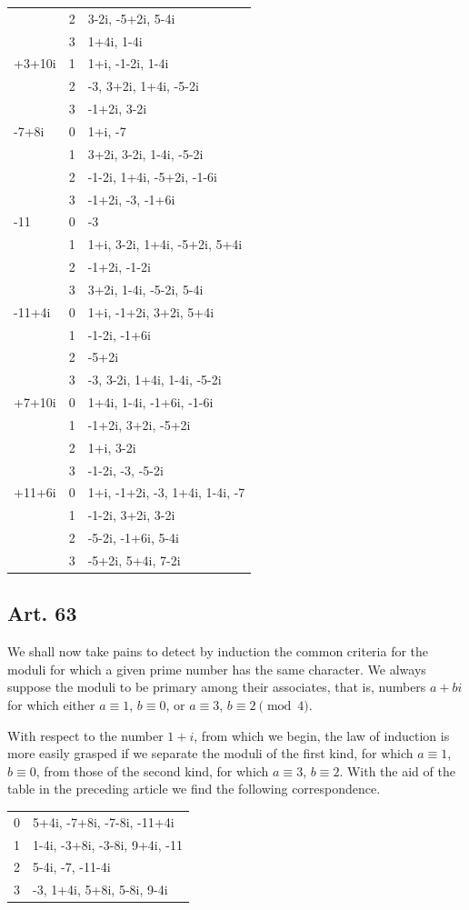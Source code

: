 \documentclass[12pt]{article}
\newcommand{\art}[1]{\subsection*{Art. #1}}
\begin{document}
\begin{center}
\begin{longtable}{L C L}
 & 2 & 3-2i, -5+2i, 5-4i\\
 & 3 & 1+4i, 1-4i\\
+3+10i & 1 & 1+i, -1-2i, 1-4i\\
 & 2 & -3, 3+2i, 1+4i, -5-2i\\
 & 3 & -1+2i, 3-2i\\
-7+8i & 0 & 1+i, -7\\
 & 1 & 3+2i, 3-2i, 1-4i, -5-2i\\
 & 2 & -1-2i, 1+4i, -5+2i, -1-6i\\
 & 3 & -1+2i, -3, -1+6i\\
-11 & 0 & -3\\
 & 1 & 1+i, 3-2i, 1+4i, -5+2i, 5+4i\\
 & 2 & -1+2i, -1-2i\\
 & 3 & 3+2i, 1-4i, -5-2i, 5-4i\\
-11+4i & 0 & 1+i, -1+2i, 3+2i, 5+4i\\
 & 1 & -1-2i, -1+6i\\
 & 2 & -5+2i\\
 & 3 & -3, 3-2i, 1+4i, 1-4i, -5-2i\\
+7+10i & 0 & 1+4i, 1-4i, -1+6i, -1-6i\\
 & 1 & -1+2i, 3+2i, -5+2i\\
 & 2 & 1+i, 3-2i\\
 & 3 & -1-2i, -3, -5-2i\\
+11+6i & 0 & 1+i, -1+2i, -3, 1+4i, 1-4i, -7\\
 & 1 & -1-2i, 3+2i, 3-2i\\
 & 2 & -5-2i, -1+6i, 5-4i\\
 & 3 & -5+2i, 5+4i, 7-2i\\
\bottomrule
\end{longtable}
\end{center}

\art{63}
We shall now take pains to detect by induction the common criteria for the moduli for which a given prime number has the same character. We always suppose the moduli to be primary among their associates, that is, numbers $a+bi$ for which either $a\equiv1$, $b\equiv0$, or $a\equiv3$, $b\equiv2\pmod4$.

With respect to the number $1+i$, from which we begin, the law of induction is more easily grasped if we separate the moduli of the first kind, for which $a\equiv1$, $b\equiv0$, from those of the second kind, for which $a\equiv3$, $b\equiv2$. With the aid of the table in the preceding article we find the following correspondence.

\begin{center}\small
\begin{tabular}{C L}
\toprule
{} & \\
 & 5+4i, -7+8i, -7-8i, -11+4i\\
1 & 1-4i, -3+8i, -3-8i, 9+4i, -11\\
2 & 5-4i, -7, -11-4i\\
3 & -3, 1+4i, 5+8i, 5-8i, 9-4i\\
\bottomrule
\end{tabular}
\end{center}
\end{document}
